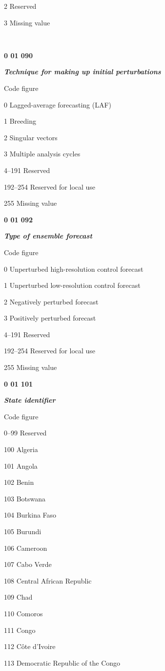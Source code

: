 2 Reserved

3 Missing value

\textbf{\\
}

\textbf{0 01 090}

\emph{\textbf{Technique for making up initial perturbations}}

Code figure

0 Lagged-average forecasting (LAF)

1 Breeding

2 Singular vectors

3 Multiple analysis cycles

4--191 Reserved

192--254 Reserved for local use

255 Missing value

\textbf{0 01 092}

\emph{\textbf{Type of ensemble forecast}}

Code figure

0 Unperturbed high-resolution control forecast

1 Unperturbed low-resolution control forecast

2 Negatively perturbed forecast

3 Positively perturbed forecast

4--191 Reserved

192--254 Reserved for local use

255 Missing value

\textbf{0 01 101}

\emph{\textbf{State identifier}}

Code figure

0--99 Reserved

100 Algeria

101 Angola

102 Benin

103 Botswana

104 Burkina Faso

105 Burundi

106 Cameroon

107 Cabo Verde

108 Central African Republic

109 Chad

110 Comoros

111 Congo

112 Côte d'Ivoire

113 Democratic Republic of the Congo

